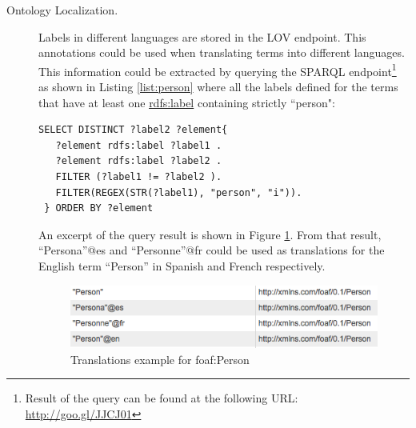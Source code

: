 \documentclass{iosart2c}
\begin{document}
\begin{description}
 \item [Ontology Localization.] Labels in different languages are stored in the LOV endpoint. This annotations could be used when translating terms into different languages. This information could be extracted by querying the SPARQL endpoint\footnote{Result of the query can be found at the following URL: \url{http://goo.gl/JJCJ01}} as shown in Listing \ref{list:person} where all the labels defined for the terms that have at least one \url{rdfs:label} containing strictly ``person":
		
    \begin{lstlisting}[basicstyle=\tiny,float=htb,caption={SPARQL query asking all the labels defined for the terms containing person.},label=list:person, language=turtle]
 SELECT DISTINCT ?label2 ?element{
   ?element rdfs:label ?label1 .
   ?element rdfs:label ?label2 .
   FILTER (?label1 != ?label2 ).
   FILTER(REGEX(STR(?label1), "person", "i")).
 } ORDER BY ?element
	\end{lstlisting}
							
   An excerpt of the query result is shown in Figure \ref{fig:translations}. From that result, ``Persona''@es and ``Personne''@fr could be used as translations for the English term ``Person'' in Spanish and French respectively. 
   
   \begin{figure}[ht!b]
     \centering
     \includegraphics[width=.90\linewidth]{translations1.png}
     \caption{Translations example for foaf:Person}
     \label{fig:translations}
   \end{figure}
   
\end{description}
\end{document}
